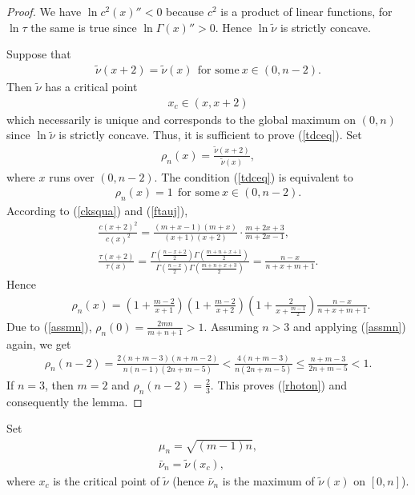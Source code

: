 \documentclass[10pt]{amsart}
\theoremstyle{remark}
\let\td=\tilde
\begin{document}
\begin{proof}
We have $\ln c^2(x)''<0$ because $c^2$ is a product of linear
functions, for $\ln\tau$ the same is true since $\ln{{\mathord{\Gamma}}}(x)''>0$.
Hence $\ln\td\nu$ is strictly concave.

Suppose that
\begin{eqnarray}\label{tdceq}
\td\nu(x+2)=\td\nu(x)~~\mbox{for some}~x\in(0,n-2).
\end{eqnarray}
Then $\td\nu$ has a critical point
\begin{eqnarray*}
x_c\in(x,x+2)
\end{eqnarray*}
which necessarily is unique and corresponds to the global maximum
on $(0,n)$ since $\ln\td\nu$ is strictly concave. Thus, it is
sufficient to prove (\ref{tdceq}). Set
\begin{eqnarray*}
\rho_n(x)=\frac{\td\nu(x+2)}{\td\nu(x)},
\end{eqnarray*}
where $x$ runs over $(0,n-2)$.  The condition (\ref{tdceq}) is
equivalent to
\begin{eqnarray}\label{rhoton}
\rho_n(x)=1~~\mbox{for some}~x\in(0,n-2).
\end{eqnarray}
According to (\ref{cksqua}) and (\ref{ftauj}),
\begin{eqnarray}
\frac{c(x+2)^2}{c(x)^2}=
\frac{(m+x-1)(m+x)}{(x+1)(x+2)}\cdot\frac{m+2x+3}{m+2x-1},\nonumber\\
\frac{\tau(x+2)}{\tau(x)}=
\frac{{{\mathord{\Gamma}}}\left(\frac{n-x+2}{2}\right){{\mathord{\Gamma}}}\left(\frac{m+n+x+1}{2}\right)}
{{{\mathord{\Gamma}}}\left(\frac{n-x}{2}\right){{\mathord{\Gamma}}}\left(\frac{m+n+x+3}{2}\right)}
=\frac{n-x}{n+x+m+1}.\label{tautau}
\end{eqnarray}
Hence
\begin{eqnarray}\label{rhofo}
\phantom{xxxx} \rho_n(x)=\left(1+\frac{m-2}{x+1}\right)
\left(1+\frac{m-2}{x+2}\right)
\left(1+\frac{2}{x+\frac{m-1}{2}}\right)\frac{n-x}{n+x+m+1}.
\end{eqnarray}
Due to (\ref{assmn}), $\rho_n(0)=\frac{2mn}{m+n+1}>1$. Assuming
$n>3$ and applying (\ref{assmn}) again, we get
\begin{eqnarray*}
\rho_n(n-2)=\frac{2(n+m-3)(n+m-2)}{n(n-1)(2n+m-5)}
<\frac{4(n+m-3)}{n(2n+m-5)}\leq \frac{n+m-3}{2n+m-5}<1.
\end{eqnarray*}
If $n=3$, then $m=2$ and $\rho_n(n-2)=\frac23$.
This proves (\ref{rhoton}) and consequently the lemma.
\end{proof}
Set
\begin{eqnarray}\label{mundew}
\mu_n=\sqrt{(m-1)n},\\
\label{defka} \bar\nu_n=\td\nu(x_c),
\end{eqnarray}
where $x_c$ is the critical point of $\td\nu$ (hence $\bar\nu_n$
is the maximum of $\td\nu(x)$ on $[0,n]$).
\end{document}
